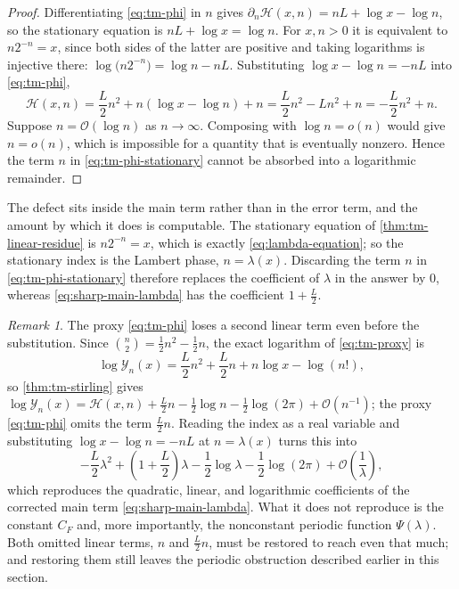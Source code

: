 \documentclass[11pt,oneside]{article}
\theoremstyle{definition}
\theoremstyle{remark}
\newtheorem{remark}[theorem]{Remark}
\newcommand{\bigO}{\mathcal O}
\newcommand{\smallo}{o}
\begin{document}
\begin{proof}
Differentiating \eqref{eq:tm-phi} in $n$ gives
$\partial_n\mathcal H(x,n)=nL+\log x-\log n$, so the stationary equation is
$nL+\log x=\log n$.  For $x,n>0$ it is equivalent to $n2^{-n}=x$, since both sides of the
latter are positive and taking logarithms is injective there:
$\log\bigl(n2^{-n}\bigr)=\log n-nL$.  Substituting $\log x-\log n=-nL$ into
\eqref{eq:tm-phi},
\begin{equation*}
 \mathcal H(x,n)=\frac L2n^2+n(\log x-\log n)+n=\frac L2n^2-Ln^2+n=-\frac L2n^2+n .
\end{equation*}
Suppose $n=\bigO(\log n)$ as $n\to\infty$.  Composing with $\log n=\smallo(n)$ would give
$n=\smallo(n)$, which is impossible for a quantity that is eventually nonzero.  Hence the
term $n$ in \eqref{eq:tm-phi-stationary} cannot be absorbed into a logarithmic remainder.
\end{proof}

The defect sits inside the main term rather than in the error term, and the amount by which
it does is computable.  The stationary equation of \cref{thm:tm-linear-residue} is
$n2^{-n}=x$, which is exactly \eqref{eq:lambda-equation}; so the stationary index is the
Lambert phase, $n=\lambda(x)$.  Discarding the term $n$ in \eqref{eq:tm-phi-stationary}
therefore replaces the coefficient of $\lambda$ in the answer by $0$, whereas
\eqref{eq:sharp-main-lambda} has the coefficient $1+\tfrac L2$.

\begin{remark}
\label{thm:tm-proxy-vs-main}
The proxy \eqref{eq:tm-phi} loses a second linear term even before the substitution.  Since
$\binom n2=\tfrac12n^2-\tfrac12n$, the exact logarithm of \eqref{eq:tm-proxy} is
\begin{equation*}
 \log \mathcal Y_n(x)=\frac L2n^2+\frac L2n+n\log x-\log(n!),
\end{equation*}
so \cref{thm:tm-stirling} gives
$\log \mathcal Y_n(x)=\mathcal H(x,n)+\tfrac L2n-\tfrac12\log n-\tfrac12\log(2\pi)+\bigO(n^{-1})$;
the proxy \eqref{eq:tm-phi} omits the term $\tfrac L2n$.  Reading the index as a real
variable and substituting $\log x-\log n=-nL$ at $n=\lambda(x)$ turns this into
\begin{equation*}
 -\frac L2\lambda^2+\left(1+\frac L2\right)\lambda-\frac12\log\lambda
 -\frac12\log(2\pi)+\bigO\!\left(\frac1\lambda\right),
\end{equation*}
which reproduces the quadratic, linear, and logarithmic coefficients of the corrected main
term \eqref{eq:sharp-main-lambda}.  What it does not reproduce is the constant $C_F$ and,
more importantly, the nonconstant periodic function $\Psi(\lambda)$.  Both omitted linear
terms, $n$ and $\tfrac L2n$, must be restored to reach even that much; and restoring them
still leaves the periodic obstruction described earlier in this section.
\end{remark}
\end{document}
